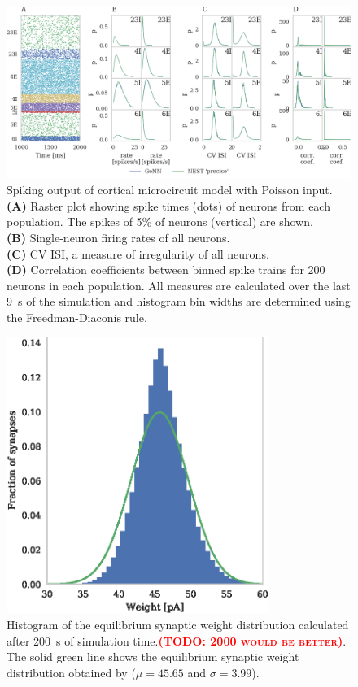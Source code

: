 \documentclass[utf8]{frontiersSCNS} %
\newcommand{\todo}[1]{\textbf{\textsc{\textcolor{red}{(TODO: #1)}}}}
\begin{document}
\begin{figure}
    \begin{center}
        \includegraphics[width=180mm]{figures/microcircuit_accuracy}
    \end{center}
    \caption{Spiking output of cortical microcircuit model with Poisson input.\\
    \textbf{(A)} Raster plot showing spike times (dots) of neurons from each population.
    The spikes of 5\% of neurons (vertical) are shown.\\
    \textbf{(B)} Single-neuron firing rates of all neurons.\\
    \textbf{(C)} CV ISI, a measure of irregularity of all neurons.\\
    \textbf{(D)} Correlation coefficients between binned spike trains for \num{200} neurons in each population.
    All measures are calculated over the last \SI{9}{\second} of the simulation and histogram bin widths are determined using the Freedman-Diaconis rule.}
    \label{fig:microcircuit_accuracy}
\end{figure}

\begin{figure}
    \begin{center}
        \includegraphics[width=85mm]{figures/mad_weights}
    \end{center}
    \caption{Histogram of the equilibrium synaptic weight distribution calculated after \SI{200}{\second} of simulation time.\todo{2000 would be better}.
    The solid green line shows the equilibrium synaptic weight distribution obtained by \citet{Morrison2007} ($\mu = 45.65$ and $\sigma = 3.99$).}
    \label{fig:mad_weights}
\end{figure}
\end{document}
